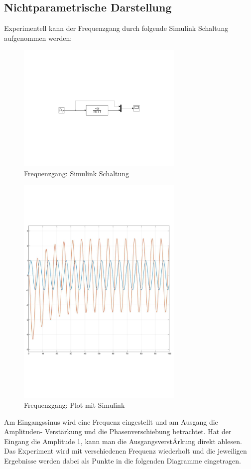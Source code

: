 \subsection{Nichtparametrische Darstellung}
Experimentell kann der Frequenzgang durch folgende Simulink Schaltung aufgenommen werden:
\begin{figure}[H]
    \centering
    \includegraphics[width=8cm]{image/FrequenzgangSchaltung.pdf}
    \caption{Frequenzgang: Simulink Schaltung}
\end{figure}
\begin{figure}[H]
    \centering
    \includegraphics[width=8cm]{image/FrequenzgangAusgang.pdf}
    \caption{Frequenzgang: Plot mit Simulink}
\end{figure}

Am Eingangssinus wird eine Frequenz eingestellt und am Ausgang die Amplituden-
Verstärkung und die Phasenverschiebung betrachtet.
Hat der Eingang die Amplitude 1, kann man die AusgangsverstÄrkung direkt
ablesen.
Das Experiment wird mit verschiedenen Frequenz wiederholt und die jeweiligen
Ergebnisse werden dabei als Punkte in die folgenden Diagramme eingetragen.
